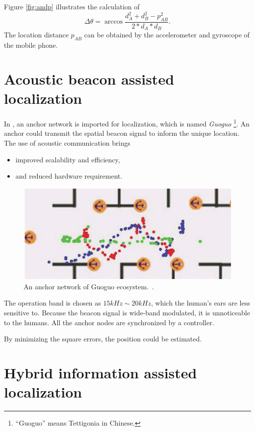 \documentclass[letterpaper]{article}
\begin{document}
Figure \ref{fig:andp} illustrates the calculation of
\begin{equation}
\Delta \theta = \arccos \frac{ d_{A}^{2}+d_{B}^{2}-p_{AB}^{2} }{ 2 * d_{A} * d_{B} }.
\end{equation}
The location distance $ p_{AB} $ can be obtained by the accelerometer and gyroscope of the mobile phone.

\section{Acoustic beacon assisted localization}

In \cite{Liu:2013:GEF:2462456.2464450}, an anchor network is imported for localization, which is named \emph{Guoguo}
\footnote{``Guoguo'' means Tettigonia in Chinese.}.
An anchor could transmit the spatial beacon signal to inform the unique location.
The use of acoustic communication brings
\begin{itemize}
	\item improved scalability and efficiency,
	\item and reduced hardware requirement.
\end{itemize}
\begin{figure}
	\centering
	\includegraphics[width=0.9\linewidth]{fig/GUOGUO.png}
	\caption{An anchor network of Guoguo ecosystem.~\cite{Liu:2013:GEF:2462456.2464450}.}
	\label{fig:guoguo}
\end{figure}
The operation band is chosen as $ 15 kHz \sim 20 kHz $, which the human's ears are less sensitive to.
Because the beacon signal is wide-band modulated, it is unnoticeable to the humans.
All the anchor nodes are synchronized by a controller.
	
By minimizing the square errors, the position could be estimated.


\section{Hybrid information assisted localization}
\end{document}
